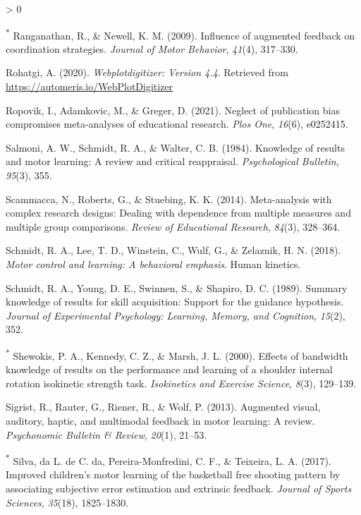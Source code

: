 \documentclass[
  english,
  man, donotrepeattitle,mask,floatsintext]{apa7}
\newlength{\cslhangindent}
\newenvironment{CSLReferences}[2] %
 {%
  \setlength{\parindent}{0pt}
  \ifodd #1 \everypar{\setlength{\hangindent}{\cslhangindent}}\ignorespaces\fi
  \ifnum #2 > 0
  \setlength{\parskip}{#2\baselineskip}
  \fi
 }%
 {}
\begin{document}
\begin{CSLReferences}{1}{0}
\leavevmode\hypertarget{ref-Ranganathan2009}{}%
\textsuperscript{*} Ranganathan, R., \& Newell, K. M. (2009). Influence of augmented feedback on coordination strategies. \emph{Journal of Motor Behavior}, \emph{41}(4), 317--330.

\leavevmode\hypertarget{ref-Rohatgi2020}{}%
Rohatgi, A. (2020). \emph{Webplotdigitizer: Version 4.4}. Retrieved from \url{https://automeris.io/WebPlotDigitizer}

\leavevmode\hypertarget{ref-Ropovik2021}{}%
Ropovik, I., Adamkovic, M., \& Greger, D. (2021). Neglect of publication bias compromises meta-analyses of educational research. \emph{Plos One}, \emph{16}(6), e0252415.

\leavevmode\hypertarget{ref-Salmoni1984}{}%
Salmoni, A. W., Schmidt, R. A., \& Walter, C. B. (1984). Knowledge of results and motor learning: A review and critical reappraisal. \emph{Psychological Bulletin}, \emph{95}(3), 355.

\leavevmode\hypertarget{ref-Scammacca2014}{}%
Scammacca, N., Roberts, G., \& Stuebing, K. K. (2014). Meta-analysis with complex research designs: Dealing with dependence from multiple measures and multiple group comparisons. \emph{Review of Educational Research}, \emph{84}(3), 328--364.

\leavevmode\hypertarget{ref-Schmidt2018}{}%
Schmidt, R. A., Lee, T. D., Winstein, C., Wulf, G., \& Zelaznik, H. N. (2018). \emph{Motor control and learning: A behavioral emphasis}. Human kinetics.

\leavevmode\hypertarget{ref-Schmidt1989}{}%
Schmidt, R. A., Young, D. E., Swinnen, S., \& Shapiro, D. C. (1989). Summary knowledge of results for skill acquisition: Support for the guidance hypothesis. \emph{Journal of Experimental Psychology: Learning, Memory, and Cognition}, \emph{15}(2), 352.

\leavevmode\hypertarget{ref-Shewokis2000}{}%
\textsuperscript{*} Shewokis, P. A., Kennedy, C. Z., \& Marsh, J. L. (2000). Effects of bandwidth knowledge of results on the performance and learning of a shoulder internal rotation isokinetic strength task. \emph{Isokinetics and Exercise Science}, \emph{8}(3), 129--139.

\leavevmode\hypertarget{ref-Sigrist2013}{}%
Sigrist, R., Rauter, G., Riener, R., \& Wolf, P. (2013). Augmented visual, auditory, haptic, and multimodal feedback in motor learning: A review. \emph{Psychonomic Bulletin \& Review}, \emph{20}(1), 21--53.

\leavevmode\hypertarget{ref-Silva2017}{}%
\textsuperscript{*} Silva, da L. de C. da, Pereira-Monfredini, C. F., \& Teixeira, L. A. (2017). Improved children's motor learning of the basketball free shooting pattern by associating subjective error estimation and extrinsic feedback. \emph{Journal of Sports Sciences}, \emph{35}(18), 1825--1830.


\end{CSLReferences}
\end{document}
